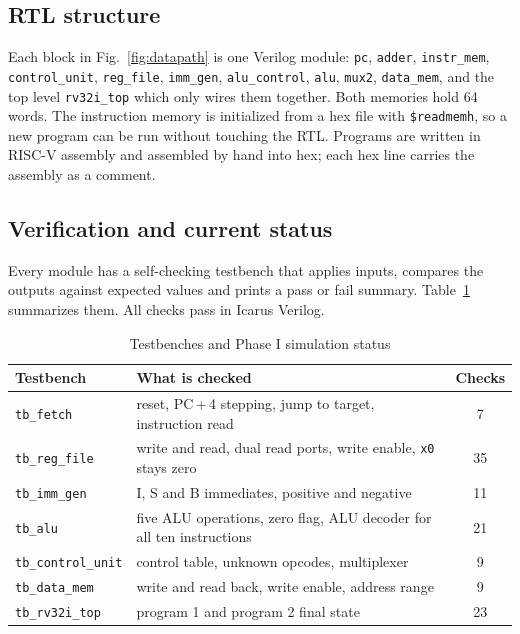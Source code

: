 \documentclass[conference]{IEEEtran}
\begin{document}
\subsection{RTL structure}
Each block in Fig.~\ref{fig:datapath} is one Verilog module: \texttt{pc},
\texttt{adder}, \texttt{instr\_mem}, \texttt{control\_unit},
\texttt{reg\_file}, \texttt{imm\_gen}, \texttt{alu\_control}, \texttt{alu},
\texttt{mux2}, \texttt{data\_mem}, and the top level \texttt{rv32i\_top}
which only wires them together. Both memories hold 64 words. The instruction
memory is initialized from a hex file with \texttt{\$readmemh}, so a new
program can be run without touching the RTL. Programs are written in RISC-V
assembly and assembled by hand into hex; each hex line carries the assembly
as a comment.

\subsection{Verification and current status}
Every module has a self-checking testbench that applies inputs, compares the
outputs against expected values and prints a pass or fail summary.
Table~\ref{tab:tests} summarizes them. All checks pass in Icarus Verilog.

\begin{table}[!htb]
\caption{Testbenches and Phase I simulation status}
\label{tab:tests}
\centering
\begin{tabular}{@{}l>{\raggedright\arraybackslash}p{4.3cm}c@{}}
\toprule
Testbench & What is checked & Checks \\
\midrule
\texttt{tb\_fetch}   & reset, PC\,+\,4 stepping, jump to target, instruction read & 7 \\
\texttt{tb\_reg\_file} & write and read, dual read ports, write enable, \texttt{x0} stays zero & 35 \\
\texttt{tb\_imm\_gen} & I, S and B immediates, positive and negative & 11 \\
\texttt{tb\_alu}     & five ALU operations, zero flag, ALU decoder for all ten instructions & 21 \\
\texttt{tb\_control\_unit} & control table, unknown opcodes, multiplexer & 9 \\
\texttt{tb\_data\_mem} & write and read back, write enable, address range & 9 \\
\texttt{tb\_rv32i\_top} & program 1 and program 2 final state & 23 \\
\bottomrule
\end{tabular}
\end{table}
\end{document}
